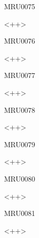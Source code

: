 \documentclass{article}
\begin{document}
\begin{corrige}{MRU0075}

<++>

\end{corrige}%


\begin{corrige}{MRU0076}

<++>

\end{corrige}%


\begin{corrige}{MRU0077}

<++>

\end{corrige}%


\begin{corrige}{MRU0078}

<++>

\end{corrige}%


\begin{corrige}{MRU0079}

<++>

\end{corrige}%


\begin{corrige}{MRU0080}

<++>

\end{corrige}%


\begin{corrige}{MRU0081}

<++>

\end{corrige}%
\end{document}

